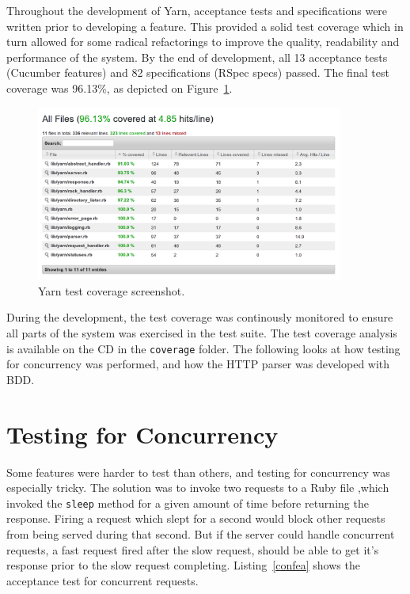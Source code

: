 Throughout the development of Yarn, acceptance tests and specifications were
written prior to developing a feature. This provided a solid test coverage
which in turn allowed for some radical refactorings to improve the quality,
readability and performance of the system. By the end of development,
all 13 acceptance tests (Cucumber features) and 82 specifications (RSpec
specs) passed.  The final test coverage was 96.13\%, as depicted on
Figure~\ref{coverage}. 

\begin{figure}[htb]
  \centering
  \includegraphics[width=0.9\textwidth]{img/coverage.png}
  \caption{Yarn test coverage screenshot.}
  \label{coverage}
\end{figure}

During the development, the test coverage was continously monitored to ensure
all parts of the system was exercised in the test suite. The test coverage
analysis is available on the CD in the \texttt{coverage} folder. The following
looks at how testing for concurrency was performed, and how the HTTP parser
was developed with BDD.

\section{Testing for Concurrency}
Some features were harder to test than others, and testing for concurrency was
especially tricky. The solution was to invoke two requests to a Ruby file
,which invoked the \texttt{sleep} method for a given amount of time before
returning the response. Firing a request which slept for a second would block
other requests from being served during that second. But if the server could
handle concurrent requests, a fast request fired after the slow request,
should be able to get it's response prior to the slow request completing.
Listing~\ref{confea} shows the acceptance test for concurrent requests.

